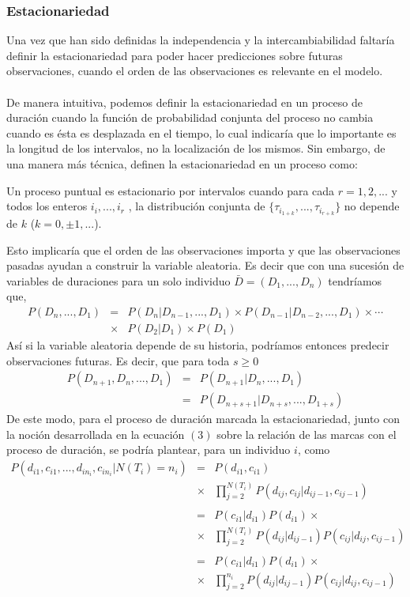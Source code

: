 \subsubsection{Estacionariedad}
Una vez que han sido definidas la independencia y la intercambiabilidad faltar\'ia definir la estacionariedad para poder hacer predicciones sobre futuras observaciones, cuando el orden de las observaciones es relevante en el modelo.\\
\\
De manera intuitiva, podemos definir la estacionariedad en un proceso de duraci\'on cuando la funci\'on de probabilidad conjunta del proceso no cambia cuando es \'esta es desplazada en el tiempo, lo cual indicar\'ia que lo importante es la longitud de los intervalos, no la localizaci\'on de los mismos. Sin embargo, de una manera m\'as t\'ecnica, \cite{daley2003} definen la estacionariedad en un proceso como:
\begin{defi}
Un proceso puntual es estacionario por intervalos cuando para cada $r=1,2,...$ y todos los enteros $i_i,...,i_r$ , la distribuci\'on conjunta de $\{\tau_{i_{1+k}},...,\tau_{i_{r+k}}\}$ no depende de $k$ ($k=0, \pm 1, ...$).
\end{defi}
Esto implicar\'ia que el orden de las observaciones importa y que las observaciones pasadas ayudan a construir la variable aleatoria. Es decir que con una sucesi\'on de variables de duraciones para un solo individuo $\bar{D}=(D_1,...,D_n)$ tendr\'iamos que,
\begin{eqnarray*}
P(D_n,...,D_1)&=&P(D_n|D_{n-1},...,D_1)\times P(D_{n-1}|D_{n-2},...,D_1)\times \cdots\\
               &\times& P(D_2|D_1)\times P(D_1)
\end{eqnarray*}	
As\'i si la variable aleatoria depende de su historia, podr\'iamos entonces predecir observaciones futuras. Es decir, que para toda $s \geq 0$
\begin{eqnarray*}
P(D_{n+1},D_n,...,D_1)&=&P(D_{n+1}|D_n,...,D_1)\\
                      &=&P(D_{n+s+1}|D_{n+s},...,D_{1+s}) \nonumber
\end{eqnarray*}
De este modo, para el proceso de duraci\'on marcada la estacionariedad, junto con la noci\'on desarrollada en la ecuaci\'on $(3)$ sobre la relaci\'on de las marcas con el proceso de duraci\'on, se podr\'ia plantear, para un individuo $i$, como
\begin{eqnarray*}
P(d_{i1},c_{i1},...,d_{in_i},c_{in_i}|N(T_i)=n_i)&=&P(d_{i1},c_{i1})\\
&\times& \prod_{j=2}^{N(T_i)} P(d_{ij},c_{ij}|d_{ij-1},c_{ij-1})\\
\\
                             &=&P(c_{i1}|d_{i1})P(d_{i1}) \times\\
                             &\times& \prod_{j=2}^{N(T_i)} P(d_{ij}|d_{ij-1})P(c_{ij}|d_{ij},c_{ij-1}) \\
                             \\
       &=& P(c_{i1}|d_{i1})P(d_{i1}) \times\\
       &\times& \prod_{j=2}^{n_i} P(d_{ij}|d_{ij-1})P(c_{ij}|d_{ij},c_{ij-1})                      
\end{eqnarray*}
